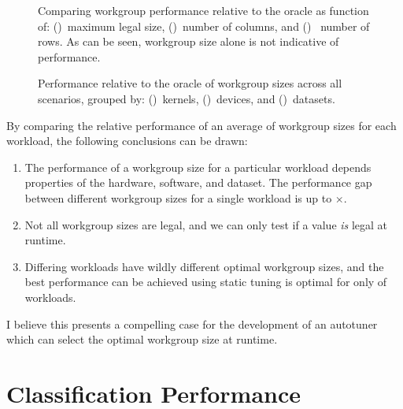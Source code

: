 
\begin{figure}

\caption{%
  Comparing workgroup performance relative to the oracle as function
  of: ()~maximum legal size,
  ()~number of columns, and
  ()~ number of rows. As can be seen,
  workgroup size alone is not indicative of performance. %
}
\label{fig:performance-wgsizes}
\end{figure}

\begin{figure}

\caption{%
  Performance relative to the oracle of workgroup sizes across all
  scenarios, grouped by: ()~kernels,
  ()~devices, and
  ()~datasets.%
}
\label{fig:performances}
\end{figure}

By comparing the relative performance of an average of
 workgroup sizes for each workload, the
following conclusions can be drawn:

\begin{enumerate}
\item The performance of a workgroup size for a particular workload
  depends properties of the hardware, software, and dataset. The
  performance gap between different workgroup sizes for a single
  workload is up to $\times$.
\item Not all workgroup sizes are legal, and we can only test if a
  value \emph{is} legal at runtime.
\item Differing workloads have wildly different optimal workgroup
  sizes, and the best performance can be achieved using static tuning
  is optimal for only  of
  workloads.
\end{enumerate}

I believe this presents a compelling case for the development of an
autotuner which can select the optimal workgroup size at runtime.


\section{Classification Performance}

